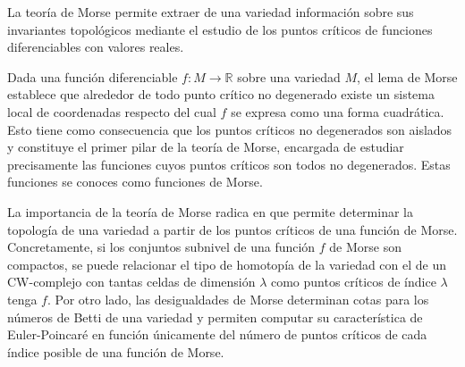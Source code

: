 La teoría de Morse permite extraer de una variedad información sobre sus invariantes topológicos mediante el estudio de los puntos críticos de funciones diferenciables con valores reales.

Dada una función diferenciable $f:M\to \mathbb{R}$ sobre una variedad $M$, el lema de Morse establece que alrededor de todo punto crítico no degenerado existe un sistema local de coordenadas respecto del cual $f$ se expresa como una forma cuadrática. Esto tiene como consecuencia que los puntos críticos no degenerados son aislados y constituye el primer pilar de la teoría de Morse, encargada de estudiar precisamente las funciones cuyos puntos críticos son todos no degenerados. Estas funciones se conoces como funciones de Morse. 

La importancia de la teoría de Morse radica en que permite determinar la topología de una variedad a partir de los puntos críticos de una función de Morse. Concretamente, si los conjuntos subnivel de una función $f$ de Morse son compactos, se puede relacionar el tipo de homotopía de la variedad con el de un CW-complejo con tantas celdas de dimensión $\lambda$ como puntos críticos de índice $\lambda$ tenga $f$. Por otro lado, las desigualdades de Morse determinan cotas para los números de Betti de una variedad y permiten computar su característica de Euler-Poincaré en función únicamente del número de puntos críticos de cada índice posible de una función de Morse.
